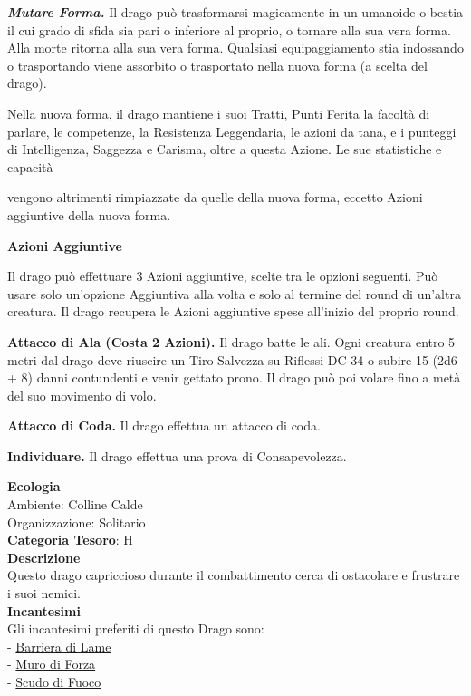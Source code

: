 \begin{multicols}{2}
{\emph{\textbf{Mutare Forma.}} Il drago può trasformarsi magicamente in un umanoide o bestia il cui grado di sfida sia pari o inferiore al proprio, o tornare alla sua vera forma. Alla morte ritorna alla sua vera forma. Qualsiasi equipaggiamento stia indossando o trasportando viene assorbito o trasportato nella nuova forma (a scelta del drago).

Nella nuova forma, il drago mantiene i suoi Tratti, Punti Ferita la facoltà di parlare, le competenze, la Resistenza Leggendaria, le azioni da tana, e i punteggi di Intelligenza, Saggezza e Carisma, oltre a questa Azione. Le sue statistiche e capacità

vengono altrimenti rimpiazzate da quelle della nuova forma, eccetto Azioni aggiuntive della nuova forma.

\textbf{Azioni Aggiuntive}

Il drago può effettuare 3 Azioni aggiuntive, scelte tra le opzioni seguenti. Può usare solo un'opzione Aggiuntiva alla volta e solo al termine del round di un'altra creatura. Il drago recupera le Azioni aggiuntive spese all'inizio del proprio round.

\textbf{Attacco di Ala (Costa 2 Azioni).} Il drago batte le ali. Ogni creatura entro 5 metri dal drago deve riuscire un Tiro Salvezza su Riflessi DC 34 o subire 15 (2d6 + 8) danni contundenti e venir gettato prono. Il drago può poi volare fino a metà del suo movimento di volo.

\textbf{Attacco di Coda.} Il drago effettua un attacco di coda.

\textbf{Individuare.} Il drago effettua una prova di Consapevolezza.

\textbf{Ecologia}\\
Ambiente: Colline Calde\\
Organizzazione: Solitario\\
\textbf{Categoria Tesoro}: H\\
\textbf{Descrizione}\\
Questo drago capriccioso durante il combattimento cerca di ostacolare e frustrare i suoi nemici.\\
\textbf{Incantesimi}\\
Gli incantesimi preferiti di questo Drago sono:\\
- \hyperlink{Barriera di Lame}{Barriera di Lame}\\
- \hyperlink{Muro di Forza}{Muro di Forza}\\
- \hyperlink{Scudo di Fuoco}{Scudo di Fuoco}

}
\end{multicols}
